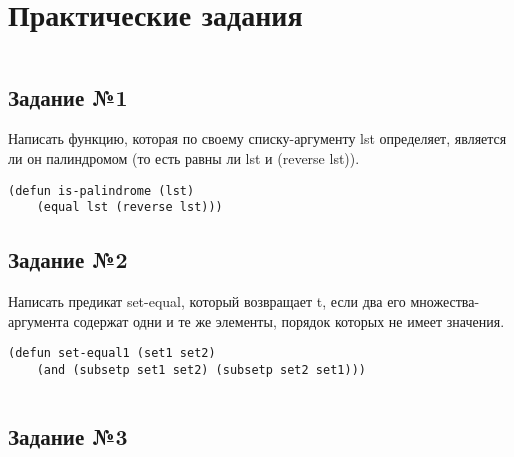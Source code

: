 \chapter{Практические задания}

\vspace{4mm}
\hfill
\begin{minipage}{0.92\linewidth}
\begin{lstlisting}
\end{lstlisting}
\end{minipage}

\section{Задание №1}

Написать функцию, которая по своему списку-аргументу lst определяет, является
ли он палиндромом (то есть равны ли lst и (reverse lst)).

\vspace{4mm}
\hfill
\begin{minipage}{0.92\linewidth}
\begin{lstlisting}
(defun is-palindrome (lst)
    (equal lst (reverse lst)))
\end{lstlisting}
\end{minipage}

\section{Задание №2}

Написать предикат set-equal, который возвращает t, если два его
множества-аргумента содержат одни и те же элементы, порядок которых не имеет
значения.

\vspace{4mm}
\begin{minipage}{0.92\linewidth}
\begin{lstlisting}
(defun set-equal1 (set1 set2)
    (and (subsetp set1 set2) (subsetp set2 set1)))
\end{lstlisting}
\end{minipage}

\vspace{4mm}
\begin{minipage}{0.92\linewidth}
\begin{lstlisting}
\end{lstlisting}
\end{minipage}

\section{Задание №3}

